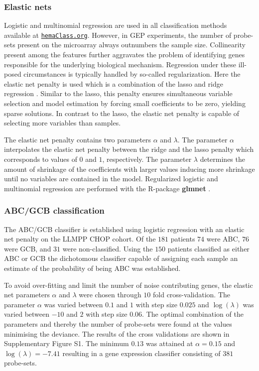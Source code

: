 \documentclass[twocolumn]{bmcart}%
\newcommand{\hemaClass}{\href{http://hemaClass.org}{\texttt{hemaClass.org}}}
\newcommand{\R}{\textsf{R}}
\newcommand{\pkg}[1]{\textbf{#1}}
\begin{document}
\subsubsection{Elastic nets}
Logistic and multinomial regression are used in all classification methods available at \hemaClass{}.
However, in GEP experiments, the number of probe-sets present on the microarray always outnumbers the sample size.
Collinearity present among the features further aggravates the problem of identifying genes responsible for the underlying biological mechanism.
Regression under these ill-posed circumstances is typically handled by so-called regularization.
Here the elastic net penalty \cite{Friedman2010, Zou2005} is used which is a combination of the lasso \cite{Tibshirani1996} and ridge regression \cite{Hoerl1970}.
Similar to the lasso, this penalty ensures simultaneous variable selection and model estimation by forcing small coefficients to be zero, yielding sparse solutions.
In contrast to the lasso, the elastic net penalty is capable of selecting more variables than samples.

The elastic net penalty contains two parameters $\alpha$ and $\lambda$.
The parameter $\alpha$ interpolates the elastic net penalty between the ridge and the lasso penalty which corresponds to values of $0$ and $1$, respectively.
The parameter $\lambda$ determines the amount of shrinkage of the coefficients with larger values inducing more shrinkage until no variables are contained in the model.
Regularized logistic and multinomial regression are performed with the \R{}-package \pkg{glmnet} \cite{Friedman2010}.



\subsubsection{ABC/GCB classification}
The ABC/GCB classifier is established using logistic regression with an elastic net penalty on the LLMPP CHOP cohort.
Of the $181$ patients $74$ were ABC, $76$ were GCB, and $31$ were non-classified.
Using the $150$ patients classified as either ABC or GCB the dichotomous classifier capable of assigning each sample an estimate of the probability of being ABC was established.

To avoid over-fitting and limit the number of noise contributing genes, the elastic net parameters $\alpha$ and $\lambda$ were chosen through $10$ fold cross-validation.
The parameter $\alpha$ was varied between $0.1$ and $1$ with step size $0.025$ and $\log(\lambda)$ was varied between $-10$ and $2$ with step size $0.06$.
The optimal combination of the parameters and thereby the number of probe-sets were found at the values minimising the deviance.
The results of the cross validations are shown in Supplementary Figure S1. The minimum $0.13$ was attained at $\alpha = 0.15$ and $\log(\lambda) = -7.41$ resulting in a gene expression classifier consisting of $381$ probe-sets.
\end{document}

